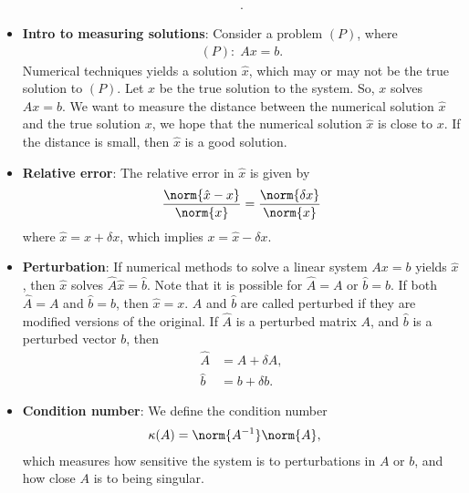 \documentclass{report}
\begin{document}
\begin{itemize}
\begin{align*}
            .\end{align*}
        \item \textbf{Intro to measuring solutions}: Consider a problem $(P)$, where
            \begin{align*}
                (P):\; Ax = b
            .\end{align*}
            Numerical techniques yields a solution $\hat{x}$, which may or may not be the true solution to $(P)$. Let $x$ be the true solution to the system. So, $x$ solves $Ax = b$. 
            \bigbreak \noindent 
            We want to measure the distance between the numerical solution $\hat{x} $ and the true solution $x$, we hope that the numerical solution $\hat{x}$ is close to $x$. If the distance is small, then $\hat{x}$ is a good solution.
        \item \textbf{Relative error}: The relative error in $\hat{x}$ is given by
            \begin{align*}
                \frac{\norm{\hat{x} - x}}{\norm{x}} = \frac{\norm{\delta x}}{\norm{x}}
            \end{align*}
            where $\hat{x} = x + \delta  x $, which implies $x = \hat{x} - \delta  x $.
        \item \textbf{Perturbation}: If numerical methods to solve a linear system $Ax = b$ yields $\hat{x}$, then $\hat{x}$ solves $\hat{A}\hat{x} = \hat{b}$. Note that it is possible for $\hat{A} = A$ or $\hat{b} = b $. If both $\hat{A} = A$ and $\hat{b} = b$, then $\hat{x} = x$.
            \bigbreak \noindent 
            $\hat{A}$ and $\hat{b}$ are called perturbed if they are modified versions of the original. If $\hat{A}$ is a perturbed matrix $A$, and $\hat{b}$ is a perturbed vector $b$, then
            \begin{align*}
                \hat{A} &= A + \delta A, \\
                \hat{b} &= b + \delta  b
            .\end{align*}
        \item \textbf{Condition number}: We define the condition number
            \begin{align*}
                \kappa(A) &= \norm{A^{-1}}\norm{A},
            \end{align*}
            which measures how sensitive the system is to perturbations in $A$ or $b$, and how close $A$ is to being singular.
            

    \end{itemize}
\end{document}

